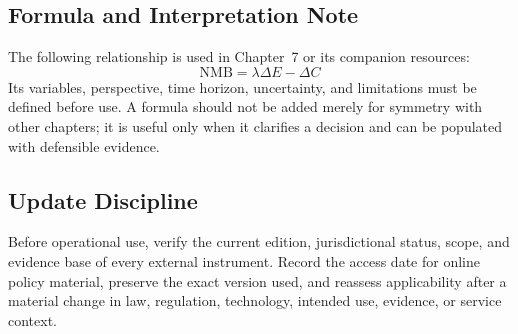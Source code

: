 \subsection{Formula and Interpretation Note}
The following relationship is used in Chapter~7 or its companion resources:
\begin{equation}
\mathrm{NMB}=\lambda\Delta E-\Delta C
\label{eq:comp-ch07-reference-formula}
\end{equation}
Its variables, perspective, time horizon, uncertainty, and limitations must be
defined before use. A formula should not be added merely for symmetry with other
chapters; it is useful only when it clarifies a decision and can be populated with
defensible evidence.

\subsection{Update Discipline}
Before operational use, verify the current edition, jurisdictional status, scope,
and evidence base of every external instrument. Record the access date for online
policy material, preserve the exact version used, and reassess applicability after a
material change in law, regulation, technology, intended use, evidence, or service
context.
